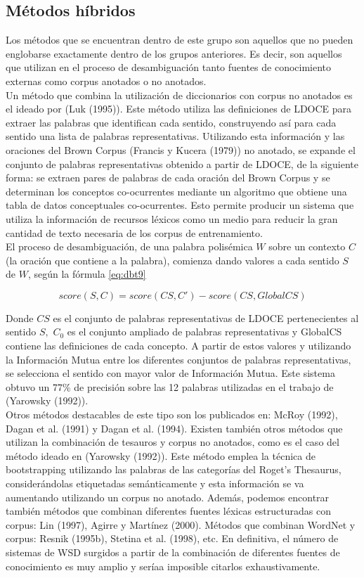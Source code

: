 \subsection{Métodos híbridos}
Los métodos que se encuentran dentro de este grupo son aquellos que no pueden englobarse exactamente dentro de los grupos anteriores. Es decir, son aquellos que utilizan en el proceso de desambiguación tanto fuentes de conocimiento externas como corpus anotados o no anotados.\\
Un método que combina la utilización de diccionarios con corpus no anotados es el ideado por (Luk (1995)). Este método utiliza las definiciones de LDOCE para extraer las palabras que identifican cada sentido, construyendo así para cada sentido una lista de palabras representativas. Utilizando esta información y las oraciones del Brown Corpus (Francis y Kucera (1979)) no anotado, se expande el conjunto de palabras representativas obtenido a partir de LDOCE, de la siguiente forma: se extraen pares de palabras de cada oración del Brown Corpus y se determinan los conceptos co-ocurrentes mediante un algoritmo que obtiene una tabla de datos conceptuales co-ocurrentes. Esto permite producir un sistema que utiliza la información de recursos léxicos como un medio para reducir la gran cantidad de texto necesaria de los corpus de entrenamiento.\\
El proceso de desambiguación,  de una palabra polisémica $W$ sobre un contexto $C$ (la oración que contiene a la palabra), comienza dando valores a cada sentido $S$ de $W$, según la fórmula \ref{eq:dbt9}

\begin{equation}
  score(S,C)=score(CS,C')-score(CS,GlobalCS)
  \label{eq:dbt9}
\end{equation}

Donde $CS$ es el conjunto de palabras representativas de LDOCE pertenecientes al sentido $S,$ $C_0$ es el conjunto ampliado de palabras representativas y GlobalCS contiene las definiciones de cada concepto. A partir de estos valores y utilizando la Información Mutua entre los diferentes conjuntos de palabras representativas, se selecciona el sentido con mayor valor de Información Mutua. Este sistema obtuvo un 77\% de precisión sobre las 12 palabras utilizadas en el trabajo de (Yarowsky (1992)).\\
Otros métodos destacables de este tipo son los publicados en: McRoy (1992), Dagan et al. (1991) y Dagan et al. (1994). Existen también otros métodos que utilizan la combinación de tesauros y corpus no anotados, como es el caso del método ideado en (Yarowsky (1992)). Este método emplea la técnica de bootstrapping utilizando las palabras de las categorías del Roget’s Thesaurus, considerándolas etiquetadas semánticamente y esta información se va aumentando utilizando un corpus no anotado. Además, podemos encontrar también métodos que combinan diferentes fuentes léxicas estructuradas con corpus: Lin (1997), Agirre y Martínez (2000). Métodos que combinan WordNet y corpus: Resnik (1995b), Stetina et al. (1998), etc. En definitiva, el número de sistemas de WSD surgidos a partir de la combinación de diferentes fuentes de conocimiento es muy amplio y seríaa imposible citarlos exhaustivamente.
